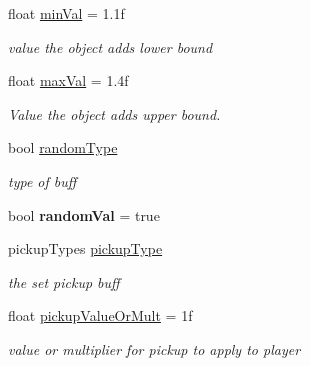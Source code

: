 \begin{DoxyCompactItemize}
\item 
\mbox{\label{class_pickup_afcd81d084c606c839108b1226233e41b}} 
float \hyperlink{class_pickup_afcd81d084c606c839108b1226233e41b}{min\+Val} = 1.\+1f
\begin{DoxyCompactList}\small\item\em value the object adds lower bound \end{DoxyCompactList}\item 
\mbox{\label{class_pickup_ab39a6532ea97da7e79051eed4414af28}} 
float \hyperlink{class_pickup_ab39a6532ea97da7e79051eed4414af28}{max\+Val} = 1.\+4f
\begin{DoxyCompactList}\small\item\em Value the object adds upper bound. \end{DoxyCompactList}\item 
\mbox{\label{class_pickup_a0154f246e4265336bb743a19dcabf224}} 
bool \hyperlink{class_pickup_a0154f246e4265336bb743a19dcabf224}{random\+Type}
\begin{DoxyCompactList}\small\item\em type of buff \end{DoxyCompactList}\item 
\mbox{\label{class_pickup_a06a0397d6124a8cd3f35f14d20c36418}} 
bool {\bfseries random\+Val} = true
\item 
\mbox{\label{class_pickup_a5dac153e6d3fc34709b91fc178bdbbbd}} 
pickup\+Types \hyperlink{class_pickup_a5dac153e6d3fc34709b91fc178bdbbbd}{pickup\+Type}
\begin{DoxyCompactList}\small\item\em the set pickup buff \end{DoxyCompactList}\item 
\mbox{\label{class_pickup_a6d7b202bd29f9c620c8d2d266318e519}} 
float \hyperlink{class_pickup_a6d7b202bd29f9c620c8d2d266318e519}{pickup\+Value\+Or\+Mult} = 1f
\begin{DoxyCompactList}\small\item\em value or multiplier for pickup to apply to player \end{DoxyCompactList}\end{DoxyCompactItemize}

